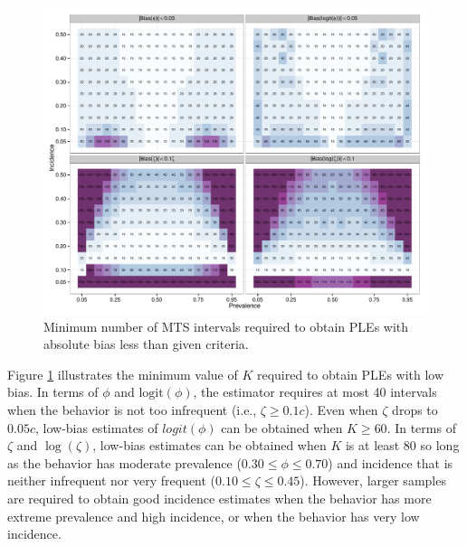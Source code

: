 \documentclass[man, noextraspace, floatsintext]{apa6}\usepackage[]{graphicx}\usepackage[]{color}
\makeatletter
\def\maxwidth{ %
  \ifdim\Gin@nat@width>\linewidth
    \linewidth
  \else
    \Gin@nat@width
  \fi
}
\newenvironment{knitrout}{}{} %
\newcommand{\logit}{\text{logit}}
\makeatother
\begin{document}
\begin{knitrout}
\color{fgcolor}\begin{figure}[tb]


{\centering \includegraphics[width=\maxwidth]{fig/MTS_sample_size} 

}

\caption[Minimum number of MTS intervals required to obtain PLEs with absolute bias less than given criteria]{Minimum number of MTS intervals required to obtain PLEs with absolute bias less than given criteria.\label{fig:MTS_sample_size}}
\end{figure}


\end{knitrout}

Figure \ref{fig:MTS_sample_size} illustrates the minimum value of $K$ required to obtain PLEs with low bias. 
In terms of $\phi$ and $\logit(\phi)$, the estimator requires at most 40 intervals when the behavior is not too infrequent (i.e., $\zeta \geq 0.1 c$).
Even when $\zeta$ drops to $0.05 c$, low-bias estimates of $logit(\phi)$ can be obtained when $K \geq 60$. 
In terms of $\zeta$ and $\log(\zeta)$, low-bias estimates can be obtained when $K$ is at least 80 so long as the behavior has moderate prevalence ($0.30 \leq \phi \leq 0.70$) and incidence that is neither infrequent nor very frequent ($0.10 \leq \zeta \leq 0.45$). 
However, larger samples are required to obtain good incidence estimates when the behavior has more extreme prevalence and high incidence, or when the behavior has very low incidence. 
\end{document}
